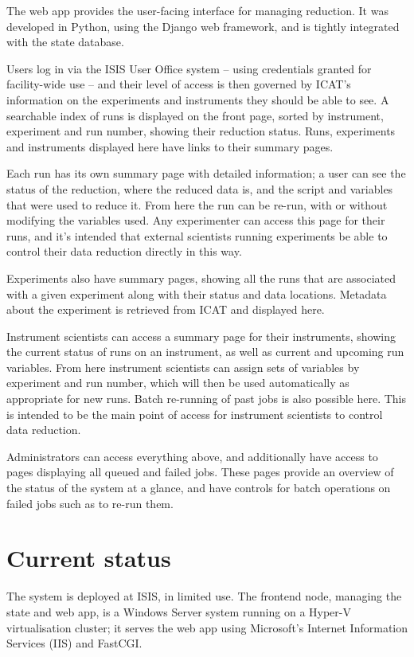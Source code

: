\documentclass[twocolumn]{article}
\begin{document}
The web app provides the user-facing interface for managing reduction.
It was developed in Python, using the Django web framework, and is
tightly integrated with the state database.

Users log in via the ISIS User Office system -- using credentials 
granted for facility-wide use -- and their level of access is then 
governed by ICAT's information on the experiments and instruments they 
should be able to see. A searchable index of runs is displayed on the front page, sorted
by instrument, experiment and run number, showing their reduction
status. Runs, experiments and instruments displayed here have links to
their summary pages.

Each run has its own summary page with detailed information; a user can
see the status of the reduction, where the reduced data is, and the
script and variables that were used to reduce it. From here the run can
be re-run, with or without modifying the variables used. Any
experimenter can access this page for their runs, and it's intended that
external scientists running experiments be able to control their data
reduction directly in this way.

Experiments also have summary pages, showing all the runs that are
associated with a given experiment along with their status and data
locations. Metadata about the experiment is retrieved from ICAT and
displayed here.

Instrument scientists can access a summary page for their instruments,
showing the current status of runs on an instrument, as well as current
and upcoming run variables. From here instrument scientists can assign
sets of variables by experiment and run number, which will then be used
automatically as appropriate for new runs. Batch re-running of past jobs
is also possible here. This is intended to be the main point of access
for instrument scientists to control data reduction.

Administrators can access everything above, and additionally have access
to pages displaying all queued and failed jobs. These pages provide an
overview of the status of the system at a glance, and have controls for
batch operations on failed jobs such as to re-run them.

\section{Current status}\label{current-status}

The system is deployed at ISIS, in limited use. The frontend node, managing
the state and web app, is a Windows Server system running on a 
Hyper-V\cite{hyper-v} virtualisation cluster; it serves the web app using
Microsoft's Internet Information Services (IIS)\cite{iis} and 
FastCGI\cite{fcgi}.
\end{document}

